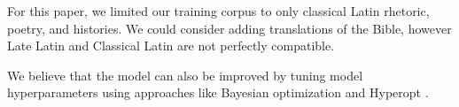\documentclass[11pt,a4paper]{article}
\begin{document}
For this paper, we limited our training corpus to only classical Latin rhetoric, poetry, and histories.
We could consider adding translations of the Bible,
however Late Latin and Classical Latin are not perfectly compatible.


We believe that the model can also be improved by tuning model hyperparameters using approaches like Bayesian optimization \cite{snoek2015scalable} and Hyperopt \cite{bergstra2015hyperopt}.


\end{document}
